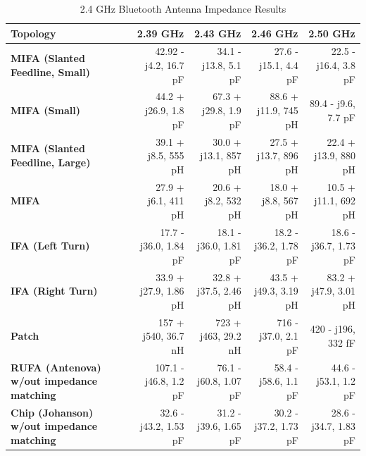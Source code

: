 \documentclass[journal,compsoc]{IEEEtran}
\begin{document}
\begin{table}[t]
  \centering
  \begin{tabular}{>{\bfseries}l|l l l l}
  \hline
    Topology & \multicolumn{1}{|c|}{2.39 GHz} & \multicolumn{1}{|c|}{2.43 GHz} & \multicolumn{1}{|c|}{2.46 GHz} & \multicolumn{1}{|c|}{2.50 GHz} \\
    \hline
    MIFA (Slanted Feedline, Small) & \multicolumn{1}{|r|}{42.92 - j4.2, 16.7 pF} & \multicolumn{1}{|r|}{34.1 - j13.8, 5.1 pF} & \multicolumn{1}{|r|}{27.6 - j15.1, 4.4 pF} & \multicolumn{1}{|r|}{22.5 - j16.4, 3.8 pF} \\
    MIFA (Small) & \multicolumn{1}{|r|}{44.2 + j26.9, 1.8 pF} & \multicolumn{1}{|r|}{67.3 + j29.8, 1.9 pF} & \multicolumn{1}{|r|}{88.6 + j11.9, 745 pH} & \multicolumn{1}{|r|}{89.4 - j9.6, 7.7 pF} \\
    MIFA (Slanted Feedline, Large) & \multicolumn{1}{|r|}{39.1 + j8.5, 555 pH} & \multicolumn{1}{|r|}{30.0 + j13.1, 857 pH} & \multicolumn{1}{|r|}{27.5 + j13.7, 896 pH} & \multicolumn{1}{|r|}{22.4 + j13.9, 880 pH} \\
    MIFA & \multicolumn{1}{|r|}{27.9 + j6.1, 411 pH} & \multicolumn{1}{|r|}{20.6 + j8.2, 532 pH} & \multicolumn{1}{|r|}{18.0 + j8.8, 567 pH} & \multicolumn{1}{|r|}{10.5 + j11.1, 692 pH} \\
    IFA (Left Turn) & \multicolumn{1}{|r|}{17.7 - j36.0, 1.84 pF} & \multicolumn{1}{|r|}{18.1 - j36.0, 1.81 pF} & \multicolumn{1}{|r|}{18.2 - j36.2, 1.78 pF} & \multicolumn{1}{|r|}{18.6 - j36.7, 1.73 pF} \\
    IFA (Right Turn) & \multicolumn{1}{|r|}{33.9 + j27.9, 1.86 pH} & \multicolumn{1}{|r|}{32.8 + j37.5, 2.46 pH} & \multicolumn{1}{|r|}{43.5 + j49.3, 3.19 pH} & \multicolumn{1}{|r|}{83.2 + j47.9, 3.01 pH} \\
    Patch & \multicolumn{1}{|r|}{157 + j540, 36.7 nH} & \multicolumn{1}{|r|}{723 + j463, 29.2 nH} & \multicolumn{1}{|r|}{716 - j37.0, 2.1 pF} & \multicolumn{1}{|r|}{420 - j196, 332 fF} \\
    RUFA (Antenova) w/out impedance matching & \multicolumn{1}{|r|}{107.1 - j46.8, 1.2 pF} & \multicolumn{1}{|r|}{76.1 - j60.8, 1.07 pF} & \multicolumn{1}{|r|}{58.4 - j58.6, 1.1 pF} & \multicolumn{1}{|r|}{44.6 - j53.1, 1.2 pF} \\
    Chip (Johanson) w/out impedance matching & \multicolumn{1}{|r|}{32.6 - j43.2, 1.53 pF} & \multicolumn{1}{|r|}{31.2 - j39.6, 1.65 pF} & \multicolumn{1}{|r|}{30.2 - j37.2, 1.73 pF} & \multicolumn{1}{|r|}{28.6 - j34.7, 1.83 pF} \\ \hline
  \end{tabular} \linebreak
  \caption{2.4 GHz Bluetooth Antenna Impedance Results}
\end{table}
\end{document}
